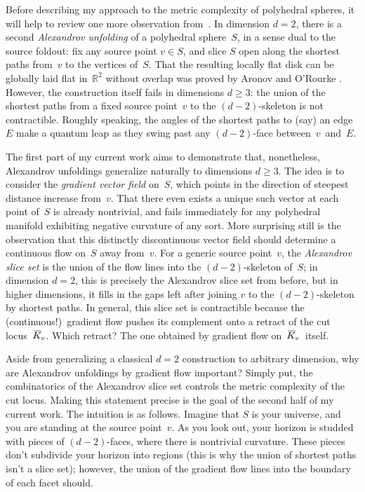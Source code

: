 \documentclass[11pt]{proposal}
\def\RR{{\mathbb R}}
\newcommand\KK{\hspace{.35ex}\ol{\hspace{-.35ex}K\hspace{-.05ex}}\hspace{.05ex}}
\newcommand\KKv{\KK_{\hspace{-.2ex}v}}
\def\ol#1{{\overline {#1}}}
\begin{document}
Before describing my approach to the metric complexity of polyhedral
spheres, it will help to review one more observation from~\cite{fold}.
In dimension $d=2$, there is a second \emph{Alexandrov unfolding}
\cite{Ale48} of a polyhedral sphere~$S$, in a sense dual to the source
foldout: fix any source point $v \in S$, and slice $S$ open along the
shortest paths from~$v$ to the vertices of~$S$.  That the resulting
locally flat disk can be globally laid flat in~$\RR^2$ without overlap
was proved by Aronov and O'Rourke \cite{AO92}.  However, the
construction itself fails in dimensions $d \geq 3$: the union of the
shortest paths from a fixed source point~$v$ to the $(d-2)$-skeleton
is not contractible.  Roughly speaking, the angles of the shortest
paths to (say) an edge~$E$ make a quantum leap as they swing past any
$(d-2)$-face between~$v$~and~$E$.

The first part \cite{unfolding} of my current work aims to demonstrate
that, nonetheless, Alexandrov unfoldings generalize naturally to
dimensions $d \geq 3$.  The idea is to consider the \emph{gradient
vector field} on~$S$, which points in the direction of steepest
distance increase from~$v$.  That there even exists a unique such
vector at each point of~$S$ is already nontrivial, and fails
immediately for any polyhedral manifold exhibiting negative curvature
of any sort.  More surprising still is the observation that this
distinctly discontinuous vector field should determine a continuous
flow on~$S$ away from~$v$.  For a generic source point~$v$, the
\emph{Alexandrov slice set} is the union of the flow lines into the
$(d-2)$-skeleton of~$S$; in dimension $d=2$, this is precisely the
Alexandrov slice set from before, but in higher dimensions, it fills
in the gaps left after joining $v$ to the $(d-2)$-skeleton by shortest
paths.  In general, this slice set is contractible because the
(continuous!)\ gradient flow pushes its complement onto a retract of
the cut locus~$\KKv$.  Which retract?  The one obtained by gradient
flow on~$\KKv$~itself.

Aside from generalizing a classical $d=2$ construction to arbitrary
dimension, why are Alexandrov unfoldings by gradient flow important?
Simply put, the combinatorics of the Alexandrov slice set controls the
metric complexity of the cut locus.  Making this statement precise is
the goal of the second half \cite{complexity} of my current work.  The
intuition is as follows.  Imagine that $S$ is your universe, and you
are standing at the source point~$v$.  As you look out, your horizon
is studded with pieces of $(d-2)$-faces, where there is nontrivial
curvature.  These pieces don't subdivide your horizon into regions
(this is why the union of shortest paths isn't a slice set); however,
the union of the gradient flow lines into the boundary of each facet
should.
\end{document}
